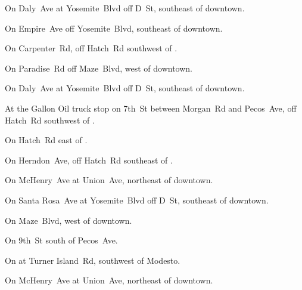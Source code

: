 
\begin{LocationList}

On Daly~Ave at  Yosemite~Blvd off D~St, southeast of downtown.

On Empire~Ave off  Yosemite~Blvd, southeast of downtown.

On Carpenter~Rd, off Hatch~Rd southwest of .

On Paradise~Rd off  Maze~Blvd, west of downtown.

On Daly~Ave at  Yosemite~Blvd off D~St, southeast of downtown.

At the Gallon Oil truck stop on 7th~St between Morgan~Rd and Pecos~Ave, off Hatch~Rd southwest of .

On Hatch~Rd east of .

On Herndon~Ave, off Hatch~Rd southeast of .

On  McHenry~Ave at Union~Ave, northeast of downtown.

On Santa Rosa~Ave at  Yosemite~Blvd off D~St, southeast of downtown.

On  Maze~Blvd, west of downtown.

\Location{\TruckService \Rest \Service}
On 9th~St south of Pecos~Ave.

On  at Turner Island~Rd, southwest of Modesto.

On  McHenry~Ave at Union~Ave, northeast of downtown.

\end{LocationList}
